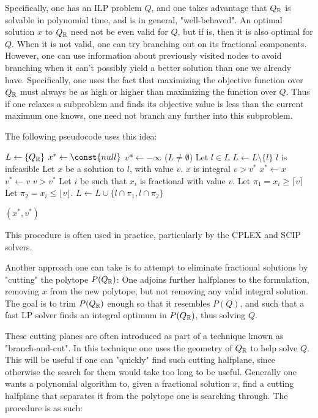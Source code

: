 Specifically, one has an ILP problem $Q$, and one takes advantage that $Q_{\mathbb{R}}$ is solvable in polynomial time, and is in general, "well-behaved". An optimal solution $x$ to $Q_{\mathbb{R}}$ need not be even valid for $Q$, but if is, then it is also optimal for $Q$. When it is not valid, one can try branching out on its fractional components. However, one can use information about previously visited nodes to avoid branching when it can't possibly yield a better solution than one we already have. Specifically, one uses the fact that maximizing the objective function over $Q_{\mathbb{R}}$ must always be as high or higher than maximizing the function over $Q$. Thus if one relaxes a subproblem and finds its objective value is less than the current maximum one knows, one need not branch any further into this subproblem.

The following pseudocode uses this idea:

\begin{codebox}
\li $L \gets \{Q_{\mathbb{R}}\}$
\li $x^* \gets \const{null}$
\li $v* \gets -\infty$
\li \While ($L \ne \emptyset$)
 \Do
\li    Let $l \in L$
\li    $L \gets L \setminus \{l\}$
\li    \If $l$ is infeasible
    \Do
\li      {}
    \End
\li    Let $x$ be a solution to $l$, with value $v$.
\li    \If $x$ is integral
    \Do
\li      \If $v > v^*$
         \Do
\li        $x^* \gets x$
\li        $v^* \gets v$
         \End
\li      {}
    \End
\li    \If $v > v^*$
    \Do
\li    Let $i$ be such that $x_i$ is fractional with value $v$.
\li    Let $\pi_1 = x_i \ge \lceil v \rceil$
\li    Let $\pi_2 = x_i \le \lfloor v \rfloor$.
\li    $L \gets L \cup \{l \cap \pi_1, l \cap \pi_2\}$
    \End
  \End

\li \Return $(x^*, v^*)$
\end{codebox}

This procedure is often used in practice, particularly by the CPLEX and SCIP solvers.

Another approach one can take is to attempt to eliminate fractional solutions by "cutting" the polytope $P(Q_{\mathbb{R}})$: One adjoins further halfplanes to the formulation, removing $x$ from the new polytope, but not removing any valid integral solution. The goal is to trim $P(Q_{\mathbb{R}})$ enough so that it resembles $P(Q)$, and such that a fast LP solver finds an integral optimum in $P(Q_{\mathbb{R}})$, thus solving $Q$.

These cutting planes are often introduced as part of a technique known as "branch-and-cut". In this technique one uses the geometry of $Q_{\mathbb{R}}$ to help solve $Q$. This will be useful if one can "quickly" find such cutting halfplane, since otherwise the search for them would take too long to be useful. Generally one wants a polynomial algorithm to, given a fractional solution $x$, find a cutting halfplane that separates it from the polytope one is searching through. The procedure is as such:

